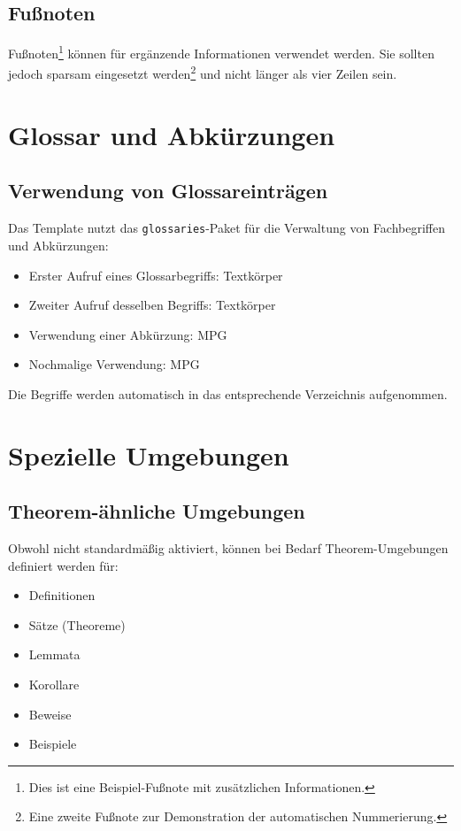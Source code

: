 \subsection*{Fußnoten}
\label{subsec:fussnoten_demo}

Fußnoten\footnote{Dies ist eine Beispiel-Fußnote mit zusätzlichen Informationen.} können für ergänzende Informationen verwendet werden. Sie sollten jedoch sparsam eingesetzt werden\footnote{Eine zweite Fußnote zur Demonstration der automatischen Nummerierung.} und nicht länger als vier Zeilen sein.

\section{Glossar und Abkürzungen}
\label{sec:glossar_demo}

\subsection*{Verwendung von Glossareinträgen}
\label{subsec:glossar_verwendung}

Das Template nutzt das \texttt{glossaries}-Paket für die Verwaltung von Fachbegriffen und Abkürzungen:
\begin{itemize}
	\item Erster Aufruf eines Glossarbegriffs: \gls{Textkörper}
	\item Zweiter Aufruf desselben Begriffs: \gls{Textkörper}
	\item Verwendung einer Abkürzung: \gls{MPG}
	\item Nochmalige Verwendung: \gls{MPG}
\end{itemize}

Die Begriffe werden automatisch in das entsprechende Verzeichnis aufgenommen.

\section{Spezielle Umgebungen}
\label{sec:spezielle_umgebungen}

\subsection*{Theorem-ähnliche Umgebungen}
\label{subsec:theoreme}

Obwohl nicht standardmäßig aktiviert, können bei Bedarf Theorem-Umgebungen definiert werden für:
\begin{itemize}
	\item Definitionen
	\item Sätze (Theoreme)
	\item Lemmata
	\item Korollare
	\item Beweise
	\item Beispiele
\end{itemize}

